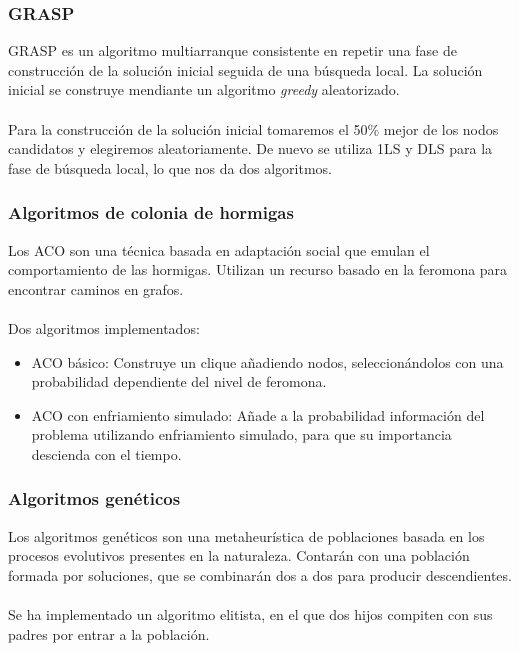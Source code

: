 \documentclass{beamer}
\theoremstyle{theorem}
\begin{document}

\begin{frame}
  \frametitle{GRASP}
  GRASP es un algoritmo multiarranque consistente en repetir una fase de construcción de la solución inicial seguida de una búsqueda local.
  La solución inicial se construye mendiante un algoritmo \textit{greedy} aleatorizado. \\~\\

  Para la construcción de la solución inicial tomaremos el 50\% mejor de los nodos candidatos y elegiremos aleatoriamente.
  De nuevo se utiliza 1LS y DLS para la fase de búsqueda local, lo que nos da dos algoritmos.

\end{frame}



\begin{frame}
  \frametitle{Algoritmos de colonia de hormigas}
  Los ACO son una técnica basada en adaptación social que emulan el comportamiento de las hormigas. Utilizan un recurso basado en
  la feromona para encontrar caminos en grafos.  \\~\\

  Dos algoritmos implementados:
  \begin{itemize}
    \item ACO básico: Construye un clique añadiendo nodos, seleccionándolos con una probabilidad dependiente del nivel de feromona.
    \item ACO con enfriamiento simulado: Añade a la probabilidad información del problema utilizando enfriamiento simulado, para
          que su importancia descienda con el tiempo. \cite{xu:2007}
 \end{itemize}

\end{frame}



\begin{frame}
  \frametitle{Algoritmos genéticos}
  Los algoritmos genéticos son una metaheurística de poblaciones basada en los procesos evolutivos presentes en la naturaleza.
  Contarán con una población formada por soluciones, que se combinarán dos a dos para producir descendientes. \\~\\

  Se ha implementado un algoritmo elitista, en el que dos hijos compiten con sus padres por entrar a la población. \cite{zhang:2014}

\end{frame}
\end{document}
